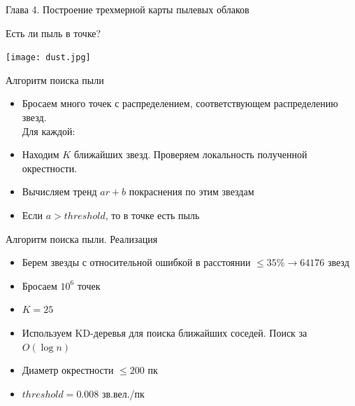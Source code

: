 \documentclass[14pt, fleqn, xcolor={dvipsnames, table}]{beamer}
\begin{document}
		\begin{frame}
            Глава 4. Построение трехмерной карты пылевых облаков 
        \end{frame}	
        
        \begin{frame}{Есть ли пыль в точке?}
            \begin{center}
                \texttt{[image: dust.jpg]}
            \end{center}
        \end{frame} 
        
         \begin{frame}{Алгоритм поиска пыли}
            \begin{itemize}
            		\item Бросаем много точек с распределением, соответствующем распределению звезд. \\ Для каждой:
            		\item Находим $K$ ближайших звезд. Проверяем локальность полученной окрестности.
            		\item Вычисляем тренд $a r + b$ покраснения по этим звездам
            		\item Если $a > threshold$, то в точке есть пыль
            \end{itemize}
        \end{frame} 
        
        
        \begin{frame}{Алгоритм поиска пыли. Реализация}
            \begin{itemize}
            		\item Берем звезды с относительной ошибкой в расстоянии $\le 35\% \longrightarrow 64176$ звезд
            		\item Бросаем $10^6$ точек
            		\item $K = 25$
            		\item Используем KD-деревья для поиска ближайших соседей. Поиск за $O(\log n)$
            		\item Диаметр окрестности $\le 200$ пк
            		\item $threshold =  0.008$ зв.вел./пк
            \end{itemize}
        \end{frame} 
        
\end{document}
